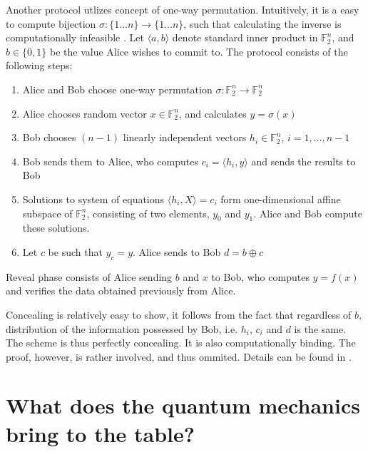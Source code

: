 \documentclass[10pt]{article}
\begin{document}
Another protocol utlizes concept of one-way permutation. Intuitively, it is a easy to compute
bijection \(\sigma\colon \{1\ldots n\}\rightarrow \{1\ldots n\}\), such that calculating the
inverse is computationally infeasible \footnotemark. Let \(\langle a,b\rangle\) denote standard
inner product in \(\mathbb{F}_2^n\), and \(b\in\{0,1\}\) be the value Alice wishes to commit to.
The protocol consists of the following steps:


\begin{enumerate}
  \item Alice and Bob choose one-way permutation \(\sigma\colon \mathbb{F}_2^n\rightarrow 
    \mathbb{F}_2^n\)
  \item Alice chooses random vector \(x\in\mathbb{F}_2^n\), and calculates \(y=\sigma(x)\)
  \item Bob chooses \((n-1)\) linearly independent vectors \(h_i\in\mathbb{F}_2^n\), 
    \(i=1,\ldots, n-1\)
  \item Bob sends them to Alice, who computes \(c_i=\langle h_i, y\rangle\) and sends the results to Bob
  \item Solutions to system of equations \(\langle h_i, X\rangle = c_i\) form one-dimensional
    affine subspace of \(\mathbb{F}_2^n\), consisting of two elements, \(y_0\) and \(y_1\). Alice
    and Bob compute these solutions.\footnotemark
  \item Let \(c\) be such that \(y_c = y\). Alice sends to Bob \(d=b\oplus c\)
\end{enumerate}

Reveal phase consists of Alice sending \(b\) and \(x\) to Bob, who computes \(y=f(x)\) and verifies
the data obtained previously from Alice.

Concealing is relatively easy to show, it follows from the fact that regardless of \(b\), distribution
of the information possessed by Bob, i.e. \(h_i\), \(c_i\) and \(d\) is the same. The scheme is thus
perfectly concealing. It is also computationally binding. The proof, however, is rather involved, and 
thus ommited. Details can be found in \cite{Naor98}.



\section{What does the quantum mechanics bring to the table?}
\end{document}

